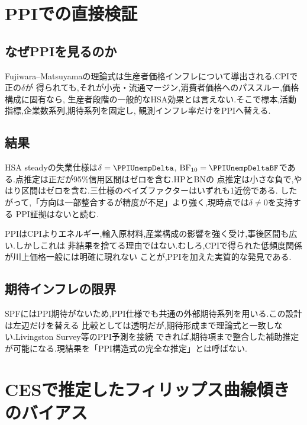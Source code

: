 \documentclass[11pt]{article}
\begin{document}
\section{PPIでの直接検証}
\label{sec:ppi-direct}

\subsection{なぜPPIを見るのか}
Fujiwara--Matsuyamaの理論式は生産者価格インフレについて導出される.CPIで正の$\delta$が
得られても,それが小売・流通マージン,消費者価格へのパススルー,価格構成に固有なら,
生産者段階の一般的なHSA効果とは言えない.そこで標本,活動指標,企業数系列,期待系列を固定し,
観測インフレ率だけをPPIへ替える.

\subsection{結果}
HSA steadyの失業仕様は$\delta=\PPIUnempDelta$,
$\mathrm{BF}_{10}=\PPIUnempDeltaBF$である.点推定は正だが95\%信用区間はゼロを含む.HPとBNの
点推定は小さな負で,やはり区間はゼロを含む.三仕様のベイズファクターはいずれも1近傍である.
したがって,「方向は一部整合するが精度が不足」より強く,現時点では$\delta\ne0$を支持する
PPI証拠はないと読む.

PPIはCPIよりエネルギー,輸入原材料,産業構成の影響を強く受け,事後区間も広い.しかしこれは
非結果を捨てる理由ではない.むしろ,CPIで得られた低頻度関係が川上価格一般には明確に現れない
ことが,PPIを加えた実質的な発見である.

\subsection{期待インフレの限界}
SPFにはPPI期待がないため,PPI仕様でも共通の外部期待系列を用いる.この設計は左辺だけを替える
比較としては透明だが,期待形成まで理論式と一致しない.Livingston Survey等のPPI予測を接続
できれば,期待項まで整合した補助推定が可能になる.現結果を「PPI構造式の完全な推定」とは呼ばない.

\begin{table}[H]
\centering
\caption{PPI・失業ギャップ・ベースライン事前のモデル別MCMC診断.}
\label{tab:ppi-main-diagnostics}
\small

\end{table}

\section{CESで推定したフィリップス曲線傾きのバイアス}
\label{sec:ces-hsa-bias}
\end{document}
